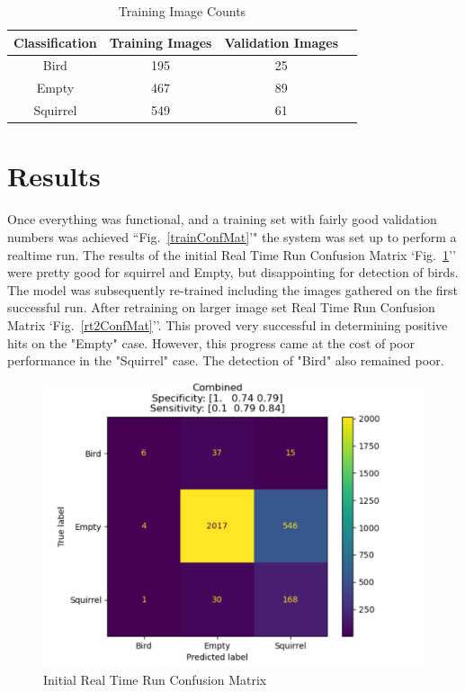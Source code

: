 \documentclass[conference]{IEEEtran}
\begin{document}
\begin{table}[htbp]
\caption{Training Image Counts}
\begin{center}
\begin{tabular}{|c|c|c|c|}
\hline
\textbf{Classification} & \textbf{Training Images}   & \textbf{Validation Images} \\ \hline 
	Bird& 195 & 25\\ \hline 
	Empty& 467 & 89\\ \hline 
	Squirrel& 549 & 61\\ \hline 
\end{tabular}
\label{numImages}
\end{center}
\end{table}

\section{Results}\label{SCM}
Once everything was functional, and a training set with fairly good validation numbers was achieved ``Fig.~\ref{trainConfMat}'" the system was set up to perform a realtime run. The results of the initial Real Time Run Confusion Matrix `Fig.~\ref{rt1ConfMat}'' were pretty good for squirrel and Empty, but disappointing for detection of birds.  The model was subsequently re-trained including the images gathered on the first successful run. After retraining on larger image set Real Time Run Confusion Matrix `Fig.~\ref{rt2ConfMat}''. This proved very successful in determining positive hits on the "Empty" case. However, this progress came at the cost of poor performance in the "Squirrel" case. The detection of "Bird" also remained poor.
\begin{figure}[htbp]
\centerline{\includegraphics[scale=0.06]{initialRunConfMat.png}}
\caption{Initial Real Time Run Confusion Matrix}
\label{rt1ConfMat}
\end{figure}
\end{document}
